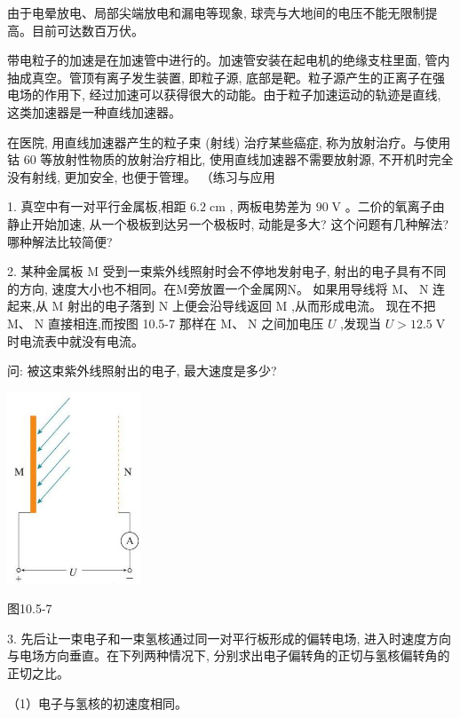 \documentclass[10pt]{article}
\begin{document}
由于电晕放电、局部尖端放电和漏电等现象, 球壳与大地间的电压不能无限制提高。目前可达数百万伏。

带电粒子的加速是在加速管中进行的。加速管安装在起电机的绝缘支柱里面, 管内抽成真空。管顶有离子发生装置, 即粒子源, 底部是靶。粒子源产生的正离子在强电场的作用下, 经过加速可以获得很大的动能。由于粒子加速运动的轨迹是直线, 这类加速器是一种直线加速器。

在医院, 用直线加速器产生的粒子束 (射线) 治疗某些癌症, 称为放射治疗。与使用钴 60 等放射性物质的放射治疗相比, 使用直线加速器不需要放射源, 不开机时完全没有射线, 更加安全, 也便于管理。 （练习与应用

1. 真空中有一对平行金属板,相距 \({6.2}\mathrm{\;{cm}}\) , 两板电势差为 \({90}\mathrm{\;V}\) 。二价的氧离子由静止开始加速, 从一个极板到达另一个极板时, 动能是多大? 这个问题有几种解法? 哪种解法比较简便?

2. 某种金属板 \(\mathrm{M}\) 受到一束紫外线照射时会不停地发射电子, 射出的电子具有不同的方向, 速度大小也不相同。在M旁放置一个金属网N。 如果用导线将 \(\mathrm{M}\text{、}\mathrm{\;N}\) 连起来,从 \(\mathrm{M}\) 射出的电子落到 \(\mathrm{N}\) 上便会沿导线返回 \(\mathrm{M}\) ,从而形成电流。 现在不把 \(\mathrm{M}\text{、}\mathrm{\;N}\) 直接相连,而按图 10.5-7 那样在 \(\mathrm{M}\text{、}\mathrm{\;N}\) 之间加电压 \(U\) ,发现当 \(U > {12.5}\mathrm{\;V}\) 时电流表中就没有电流。

问: 被这束紫外线照射出的电子, 最大速度是多少?

\begin{center}
\includegraphics[max width=0.3\textwidth]{images/01911d5f-8e38-70c0-b5b8-2b399bd115b6_54_814742.jpg}
\end{center}

图10.5-7

3. 先后让一束电子和一束氢核通过同一对平行板形成的偏转电场, 进入时速度方向与电场方向垂直。在下列两种情况下, 分别求出电子偏转角的正切与氢核偏转角的正切之比。

（1）电子与氢核的初速度相同。
\end{document}
